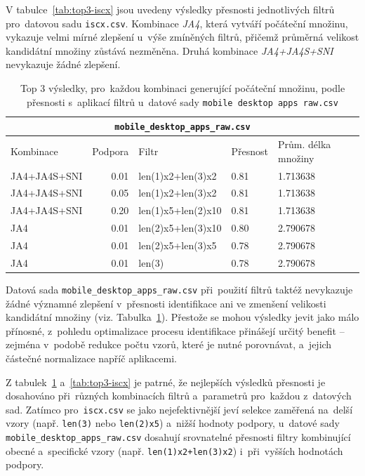 V tabulce~\ref{tab:top3-iscx} jsou uvedeny výsledky přesnosti jednotlivých filtrů pro~datovou sadu \texttt{iscx.csv}. Kombinace \textit{JA4}, která vytváří počáteční množinu, vykazuje velmi mírné zlepšení u~výše zmíněných filtrů, přičemž průměrná velikost kandidátní množiny zůstává nezměněna. Druhá kombinace \textit{JA4+JA4S+SNI} nevykazuje žádné zlepšení.

\begin{table}[H]
	\centering
	\begin{tabular}{lrlll}
		\toprule
		\multicolumn{5}{c}{\texttt{mobile\_desktop\_apps\_raw.csv}}  \\
		\midrule
		Kombinace    & Podpora & Filtr              & Přesnost & Prům. délka množiny \\
		\midrule
		JA4+JA4S+SNI & 0.01    & len(1)x2+len(3)x2  & 0.81      & 1.713638                    \\
		JA4+JA4S+SNI & 0.05    & len(1)x2+len(3)x2  & 0.81      & 1.713638                    \\
		JA4+JA4S+SNI & 0.20    & len(1)x5+len(2)x10 & 0.81      & 1.713638                    \\
		JA4          & 0.01    & len(2)x5+len(3)x10 & 0.80      & 2.790678                    \\
		JA4          & 0.01    & len(2)x5+len(3)x5  & 0.78      & 2.790678                    \\
		JA4          & 0.01    & len(3)             & 0.78      & 2.790678                    \\
		\bottomrule
	\end{tabular}
	\caption{Top 3 výsledky, pro~každou kombinaci generující počáteční množinu,  podle přesnosti s~aplikací filtrů  u~datové sady \texttt{mobile desktop apps raw.csv}}
	\label{tab:top3-mobile}
\end{table} 

Datová sada \texttt{mobile\_desktop\_apps\_raw.csv} při~použití filtrů taktéž nevykazuje žádné významné zlepšení v~přesnosti identifikace ani ve zmenšení velikosti kandidátní množiny (viz. Tabulka~\ref{tab:top3-mobile}). Přestože se mohou výsledky jevit jako málo přínosné, z~pohledu optimalizace procesu identifikace přinášejí určitý benefit -- zejména v~podobě redukce počtu vzorů, které je nutné porovnávat, a~jejich částečné normalizace napříč aplikacemi.

Z tabulek~\ref{tab:top3-mobile} a~\ref{tab:top3-iscx} je patrné, že nejlepších výsledků přesnosti je dosahováno při~různých kombinacích filtrů a~parametrů pro~každou z~datových sad. Zatímco pro~\texttt{iscx.csv} se jako nejefektivnější jeví selekce zaměřená na~delší vzory (např. \texttt{len(3)} nebo \texttt{len(2)x5}) a~nižší hodnoty podpory, u~datové sady \texttt{mobile\_desktop\_apps\_raw.csv} dosahují srovnatelné přesnosti filtry kombinující obecné a~specifické vzory (např. \texttt{len(1)x2+len(3)x2}) i~při~vyšších hodnotách podpory.

